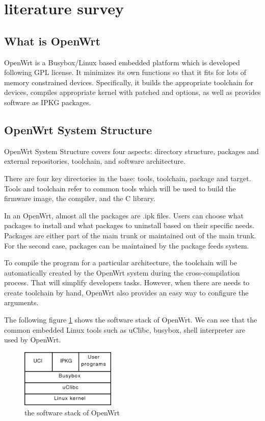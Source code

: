 \documentclass{sig-alternate-05-2015}
\begin{document}
	\section{literature survey}
	
	\subsection{What is OpenWrt}
	OpenWrt \cite{fainelli2008openwrt, kim2014implementation} is a Busybox/Linux based embedded platform which is developed following GPL license. It minimizes its own functions so that it fits for lots of memory constrained devices. Specifically, it builds the appropriate toolchain for devices, compiles appropriate kernel with patched and options, as well as provides software as IPKG packages.
	
	\subsection{OpenWrt System Structure}
	OpenWrt System Structure covers four aspects: directory structure, packages and external repositories, toolchain, and software architecture.
	
	There are four key directories in the base: tools, toolchain, package and target.
	Tools and toolchain refer to common tools which will be used to build the firmware image, the compiler, and the C library.
	
	In an OpenWrt, almost all the packages are .ipk files. Users can choose what packages to install and what packages to uninstall based on their specific needs. Packages are either part of the main trunk or maintained out of the main trunk. For the second case, packages can be maintained by the package feeds system.
	
	To compile the program for a particular architecture, the toolchain will be automatically created by the OpenWrt system during the cross-compilation process. That will simplify developers tasks. However, when there are needs to create toolchain by hand, OpenWrt also provides an easy way to configure the arguments.
	
	The following figure \ref{OpenWrt:stack} shows the software stack of OpenWrt. We can see that the common embedded Linux tools such as uClibc, busybox, shell interpreter are used by OpenWrt.
	
	\begin{figure}
		\centering
		\includegraphics[width=0.4\textwidth]{stack.png}
		\caption{the software stack of OpenWrt}
		\label{OpenWrt:stack}
	\end{figure}
	
\end{document}
